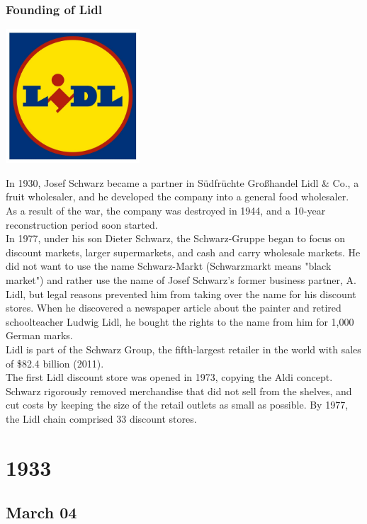 \documentclass[11pt]{report}
\begin{document}
\subsection{Founding of Lidl}
\vspace{2mm}\begin{center}\includegraphics[width=5cm]{./img/lidlLogo.jpg}\end{center}
In 1930, Josef Schwarz became a partner in Südfrüchte Großhandel Lidl \& Co., a fruit wholesaler, and he developed the company into a general food wholesaler. As a result of the war, the company was destroyed in 1944, and a 10-year reconstruction period soon started.\\
\indent In 1977, under his son Dieter Schwarz, the Schwarz-Gruppe began to focus on discount markets, larger supermarkets, and cash and carry wholesale markets. He did not want to use the name Schwarz-Markt (Schwarzmarkt means "black market") and rather use the name of Josef Schwarz's former business partner, A. Lidl, but legal reasons prevented him from taking over the name for his discount stores. When he discovered a newspaper article about the painter and retired schoolteacher Ludwig Lidl, he bought the rights to the name from him for 1,000 German marks.\\
\indent Lidl is part of the Schwarz Group, the fifth-largest retailer in the world with sales of \$82.4 billion (2011).\\ \indent The first Lidl discount store was opened in 1973, copying the Aldi concept. Schwarz rigorously removed merchandise that did not sell from the shelves, and cut costs by keeping the size of the retail outlets as small as possible. By 1977, the Lidl chain comprised 33 discount stores.

\chapter{1933}
\section{March 04}
\end{document}
